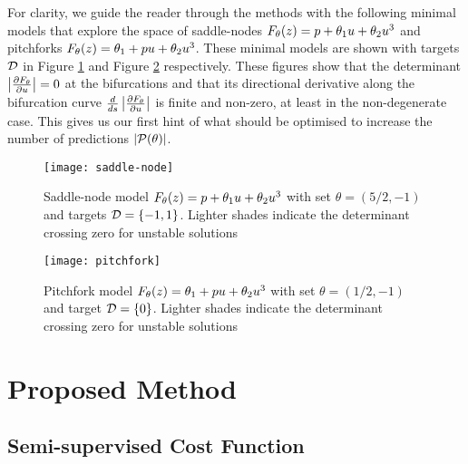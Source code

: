 For clarity, we guide the reader through the methods with the following minimal models that explore the space of saddle-nodes $F_{\theta}(z) = p + \theta_{1}u+\theta_{2}u^3$ and pitchforks $F_{\theta}(z) = \theta_{1} + p u+\theta_{2}u^3$. These minimal models are shown with targets $\mathcal{D}$ in Figure \ref{fig:saddle-node} and Figure \ref{fig:pitchfork} respectively. These figures show that the determinant $\left| \frac{\partial F_{\theta}}{\partial u} \right|=0$ at the bifurcations and that its directional derivative along the bifurcation curve $\frac{d}{ds}\left| \frac{\partial F_{\theta}}{\partial u} \right|$ is finite and non-zero, at least in the non-degenerate case. This gives us our first hint of what should be optimised to increase the number of predictions $|\mathcal{P}(\theta)|$.

\begin{figure}
\centering
\texttt{[image: saddle-node]}
\caption{Saddle-node model $F_{\theta}(z) = p + \theta_{1}u+\theta_{2}u^3$ with set $\theta=(5/2,-1)$ and targets $\mathcal{D}=\{-1,1\}$. Lighter shades indicate the determinant crossing zero for unstable solutions}
\label{fig:saddle-node}
\end{figure}

\begin{figure}
\centering
\texttt{[image: pitchfork]}
\caption{Pitchfork model $F_{\theta}(z) = \theta_{1} + p u+\theta_{2}u^3$ with set $\theta=(1/2,-1)$ and target $\mathcal{D}=\{0\}$. Lighter shades indicate the determinant crossing zero for unstable solutions}
\label{fig:pitchfork}
\end{figure}

\section{Proposed Method}

\subsection{Semi-supervised Cost Function}

